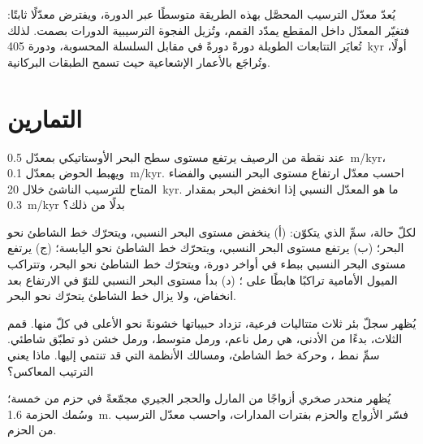 يُعدّ معدّل الترسيب المحصَّل بهذه الطريقة متوسطًا عبر الدورة، ويفترض
معدّلًا ثابتًا: فتغيّر المعدّل داخل المقطع يمدّد القمم،
وتُزيل الفجوة الترسيبية الدورات بصمت. لذلك تُعايَر التتابعات الطويلة
دورةً دورةً في مقابل السلسلة المحسوبة، ودورة \qty{405}{kyr} أولًا،
وتُراجَع بالأعمار الإشعاعية حيث تسمح الطبقات البركانية.

\section{التمارين}

\begin{exercise}[$\star$]\label{exo:b3:sequence-stratigraphy:1}
عند نقطة من الرصيف يرتفع مستوى سطح البحر الأوستاتيكي بمعدّل \qty{0.5}{m/kyr}، ويهبط الحوض
بمعدّل \qty{0.1}{m/kyr}. احسب معدّل ارتفاع مستوى البحر
النسبي والفضاء المتاح للترسيب الناشئ خلال \qty{20}{kyr}. ما هو
المعدّل النسبي إذا انخفض البحر بمقدار \qty{0.3}{m/kyr} بدلًا من ذلك؟
\end{exercise}

\begin{exercise}[$\star$]\label{exo:b3:sequence-stratigraphy:2}
لكلّ حالة، سمِّ  الذي يتكوّن: (أ) ينخفض مستوى البحر النسبي،
ويتحرّك خط الشاطئ نحو البحر؛ (ب) يرتفع مستوى البحر النسبي، ويتحرّك
خط الشاطئ نحو اليابسة؛ (ج) يرتفع مستوى البحر النسبي ببطء في أواخر
دورة، ويتحرّك خط الشاطئ نحو البحر، وتتراكب الميول الأمامية تراكبًا هابطًا على
؛ (د) بدأ مستوى البحر النسبي للتوّ في الارتفاع بعد
انخفاض، ولا يزال خط الشاطئ يتحرّك نحو البحر.
\end{exercise}

\begin{exercise}[$\star$]\label{exo:b3:sequence-stratigraphy:3}
يُظهر سجلّ بئر ثلاث متتاليات فرعية، تزداد حبيباتها خشونةً نحو الأعلى في كلّ منها. قمم
الثلاث، بدءًا من الأدنى، هي رمل ناعم، ورمل متوسط، ورمل خشن
ذو تطبّق شاطئي. سمِّ نمط ، وحركة خط الشاطئ،
ومسالك الأنظمة التي قد تنتمي إليها. ماذا يعني الترتيب المعاكس؟
\end{exercise}

\begin{exercise}[$\star$]\label{exo:b3:sequence-stratigraphy:4}
يُظهر منحدر صخري أزواجًا من المارل والحجر الجيري مجمّعةً في حزم من خمسة؛
وسُمك الحزمة \qty{1.6}{m}. فسّر الأزواج والحزم بفترات المدارات،
واحسب معدّل الترسيب من الحزم.
\end{exercise}

